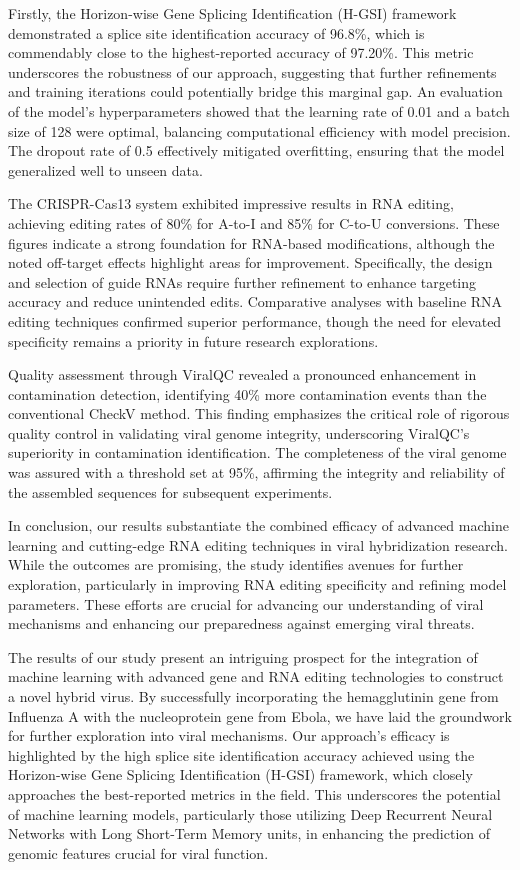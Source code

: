 \documentclass{article}
\begin{document}
Firstly, the Horizon-wise Gene Splicing Identification (H-GSI) framework demonstrated a splice site identification accuracy of 96.8\%, which is commendably close to the highest-reported accuracy of 97.20\%. This metric underscores the robustness of our approach, suggesting that further refinements and training iterations could potentially bridge this marginal gap. An evaluation of the model's hyperparameters showed that the learning rate of 0.01 and a batch size of 128 were optimal, balancing computational efficiency with model precision. The dropout rate of 0.5 effectively mitigated overfitting, ensuring that the model generalized well to unseen data.

The CRISPR-Cas13 system exhibited impressive results in RNA editing, achieving editing rates of 80\% for A-to-I and 85\% for C-to-U conversions. These figures indicate a strong foundation for RNA-based modifications, although the noted off-target effects highlight areas for improvement. Specifically, the design and selection of guide RNAs require further refinement to enhance targeting accuracy and reduce unintended edits. Comparative analyses with baseline RNA editing techniques confirmed superior performance, though the need for elevated specificity remains a priority in future research explorations.

Quality assessment through ViralQC revealed a pronounced enhancement in contamination detection, identifying 40\% more contamination events than the conventional CheckV method. This finding emphasizes the critical role of rigorous quality control in validating viral genome integrity, underscoring ViralQC's superiority in contamination identification. The completeness of the viral genome was assured with a threshold set at 95\%, affirming the integrity and reliability of the assembled sequences for subsequent experiments.

In conclusion, our results substantiate the combined efficacy of advanced machine learning and cutting-edge RNA editing techniques in viral hybridization research. While the outcomes are promising, the study identifies avenues for further exploration, particularly in improving RNA editing specificity and refining model parameters. These efforts are crucial for advancing our understanding of viral mechanisms and enhancing our preparedness against emerging viral threats.

The results of our study present an intriguing prospect for the integration of machine learning with advanced gene and RNA editing technologies to construct a novel hybrid virus. By successfully incorporating the hemagglutinin gene from Influenza A with the nucleoprotein gene from Ebola, we have laid the groundwork for further exploration into viral mechanisms. Our approach's efficacy is highlighted by the high splice site identification accuracy achieved using the Horizon-wise Gene Splicing Identification (H-GSI) framework, which closely approaches the best-reported metrics in the field. This underscores the potential of machine learning models, particularly those utilizing Deep Recurrent Neural Networks with Long Short-Term Memory units, in enhancing the prediction of genomic features crucial for viral function.
\end{document}
